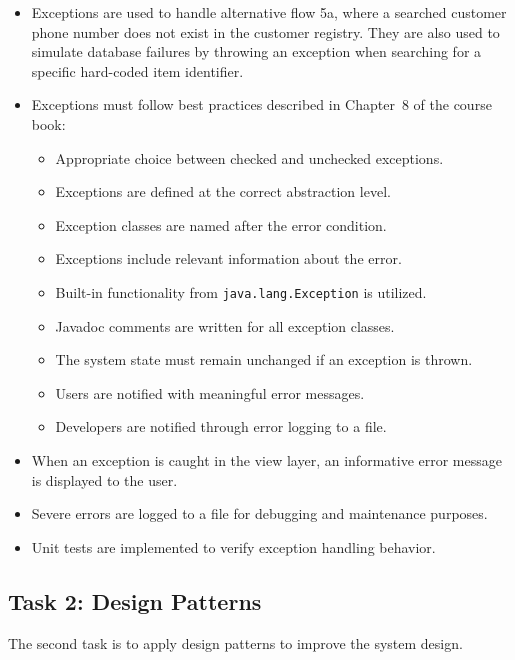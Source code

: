 \documentclass[a4paper]{scrartcl}
\begin{document}
\begin{itemize}
    \item Exceptions are used to handle alternative flow 5a, where a searched customer phone number does not exist in the customer registry. They are also used to simulate database failures by throwing an exception when searching for a specific hard-coded item identifier.
    
    \item Exceptions must follow best practices described in Chapter~8 of the course book:
    \begin{itemize}
        \item Appropriate choice between checked and unchecked exceptions.
        \item Exceptions are defined at the correct abstraction level.
        \item Exception classes are named after the error condition.
        \item Exceptions include relevant information about the error.
        \item Built-in functionality from \texttt{java.lang.Exception} is utilized.
        \item Javadoc comments are written for all exception classes.
        \item The system state must remain unchanged if an exception is thrown.
        \item Users are notified with meaningful error messages.
        \item Developers are notified through error logging to a file.
    \end{itemize}
    \item When an exception is caught in the view layer, an informative error message is displayed to the user.
    \item Severe errors are logged to a file for debugging and maintenance purposes.
    \item Unit tests are implemented to verify exception handling behavior.
\end{itemize}

\subsection*{Task 2: Design Patterns}

The second task is to apply design patterns to improve the system design.
\end{document}

